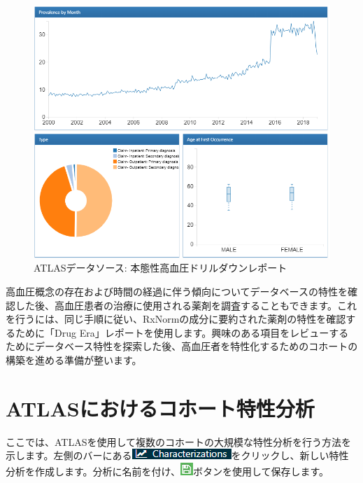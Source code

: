 \documentclass[
  11pt]{book}
\theoremstyle{definition}
\theoremstyle{definition}
\theoremstyle{definition}
\theoremstyle{definition}
\theoremstyle{remark}
\begin{document}
\begin{figure}

{\centering \includegraphics[width=1\linewidth]{images/Characterization/atlasDataSourcesDrillDownReport} 

}

\caption{ATLASデータソース: 本態性高血圧ドリルダウンレポート}\label{fig:atlasDataSourcesDrillDownReport}
\end{figure}

高血圧概念の存在および時間の経過に伴う傾向についてデータベースの特性を確認した後、高血圧患者の治療に使用される薬剤を調査することもできます。これを行うには、同じ手順に従い、RxNormの成分に要約された薬剤の特性を確認するために「Drug Era」レポートを使用します。興味のある項目をレビューするためにデータベース特性を探索した後、高血圧者を特性化するためのコホートの構築を進める準備が整います。

\section{ATLASにおけるコホート特性分析}\label{atlasux306bux304aux3051ux308bux30b3ux30dbux30fcux30c8ux7279ux6027ux5206ux6790}

ここでは、ATLASを使用して複数のコホートの大規模な特性分析を行う方法を示します。左側のバーにある\includegraphics{images/Characterization/atlasCharacterizationMenuItem.png}をクリックし、新しい特性分析を作成します。分析に名前を付け、\includegraphics{images/PopulationLevelEstimation/save.png}ボタンを使用して保存します。
\end{document}
